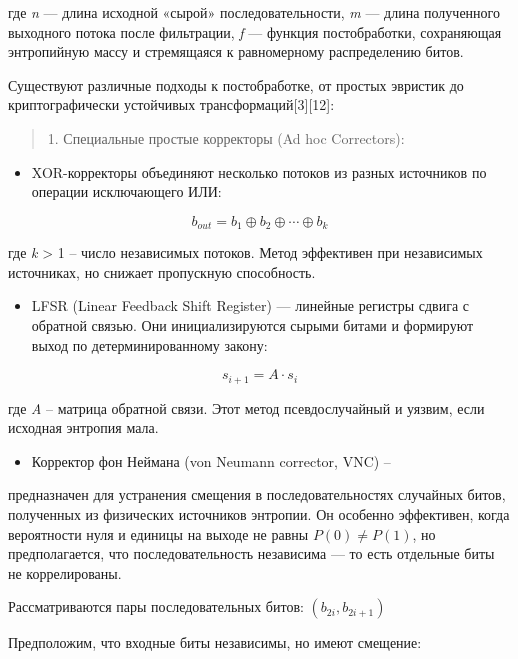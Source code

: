 где \emph{n} --- длина исходной «сырой» последовательности, \emph{m} ---
длина полученного выходного потока после фильтрации, \emph{f} ---
функция постобработки, сохраняющая энтропийную массу и стремящаяся к
равномерному распределению битов.

Существуют различные подходы к постобработке, от простых эвристик до
криптографически устойчивых трансформаций{[}3{]}{[}12{]}:

\begin{quote}
1. Специальные простые корректоры (Ad hoc Correctors):
\end{quote}

\begin{itemize}
\item
  XOR-корректоры объединяют несколько потоков из разных источников по
  операции исключающего ИЛИ:
\end{itemize}

\[b_{out} = b_{1} \oplus b_{2} \oplus \cdots \oplus b_{k}\]

где \emph{k} \textgreater{} 1 -- число независимых потоков. Метод
эффективен при независимых источниках, но снижает пропускную
способность.

\begin{itemize}
\item
  LFSR (Linear Feedback Shift Register) --- линейные регистры сдвига с
  обратной связью. Они инициализируются сырыми битами и формируют выход
  по детерминированному закону:
\end{itemize}

\[s_{i + 1} = A \cdot s_{i}\]

где \emph{A} -- матрица обратной связи. Этот метод псевдослучайный и
уязвим, если исходная энтропия мала.

\begin{itemize}
\item
  Корректор фон Неймана (von Neumann corrector, VNC) --
\end{itemize}

предназначен для устранения смещения в последовательностях случайных
битов, полученных из физических источников энтропии. Он особенно
эффективен, когда вероятности нуля и единицы на выходе не равны
\(P(0) \neq P(1)\), но предполагается, что последовательность независима
--- то есть отдельные биты не коррелированы.

Рассматриваются пары последовательных битов: \((b_{2i},b_{2i + 1})\)

Предположим, что входные биты независимы, но имеют смещение:

